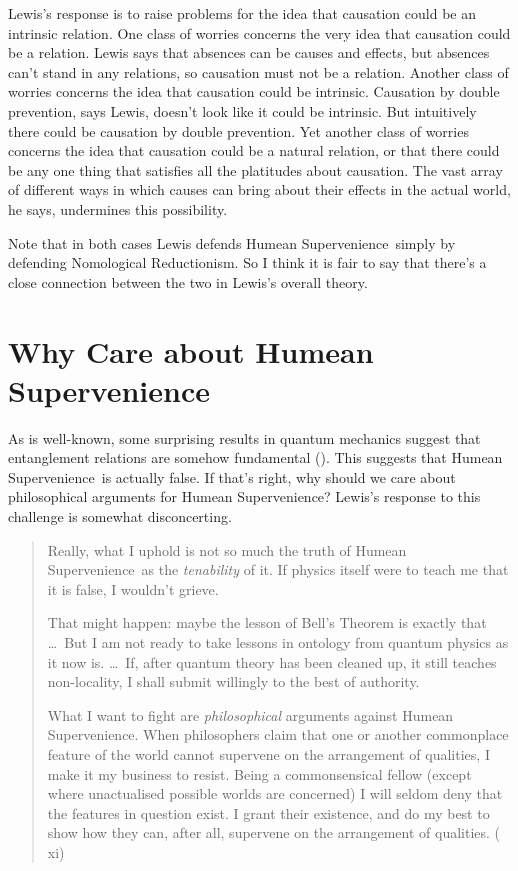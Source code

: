 \documentclass[
  11pt,
  letterpaper,
  DIV=11,
  numbers=noendperiod,
  twoside]{scrartcl}
\begin{document}
Lewis's response is to raise problems for the idea that causation could
be an intrinsic relation. One class of worries concerns the very idea
that causation could be a relation. Lewis says that absences can be
causes and effects, but absences can't stand in any relations, so
causation must not be a relation. Another class of worries concerns the
idea that causation could be intrinsic. Causation by double prevention,
says Lewis, doesn't look like it could be intrinsic. But intuitively
there could be causation by double prevention. Yet another class of
worries concerns the idea that causation could be a natural relation, or
that there could be any one thing that satisfies all the platitudes
about causation. The vast array of different ways in which causes can
bring about their effects in the actual world, he says, undermines this
possibility.

Note that in both cases Lewis defends Humean Supervenience~simply by
defending Nomological Reductionism. So I think it is fair to say that
there's a close connection between the two in Lewis's overall theory.

\section{Why Care about Humean
Supervenience}\label{why-care-about-humean-supervenience}

As is well-known, some surprising results in quantum mechanics suggest
that entanglement relations are somehow fundamental
(). This suggests that Humean
Supervenience~is actually false. If that's right, why should we care
about philosophical arguments for Humean Supervenience? Lewis's response
to this challenge is somewhat disconcerting.

\begin{quote}
Really, what I uphold is not so much the truth of Humean
Supervenience~as the \emph{tenability} of it. If physics itself were to
teach me that it is false, I wouldn't grieve.

That might happen: maybe the lesson of Bell's Theorem is exactly that
\ldots~But I am not ready to take lessons in ontology from quantum
physics as it now is. \ldots~If, after quantum theory has been cleaned
up, it still teaches non-locality, I shall submit willingly to the best
of authority.

What I want to fight are \emph{philosophical} arguments against Humean
Supervenience. When philosophers claim that one or another commonplace
feature of the world cannot supervene on the arrangement of qualities, I
make it my business to resist. Being a commonsensical fellow (except
where unactualised possible worlds are concerned) I will seldom deny
that the features in question exist. I grant their existence, and do my
best to show how they can, after all, supervene on the arrangement of
qualities. ( xi)
\end{quote}
\end{document}
